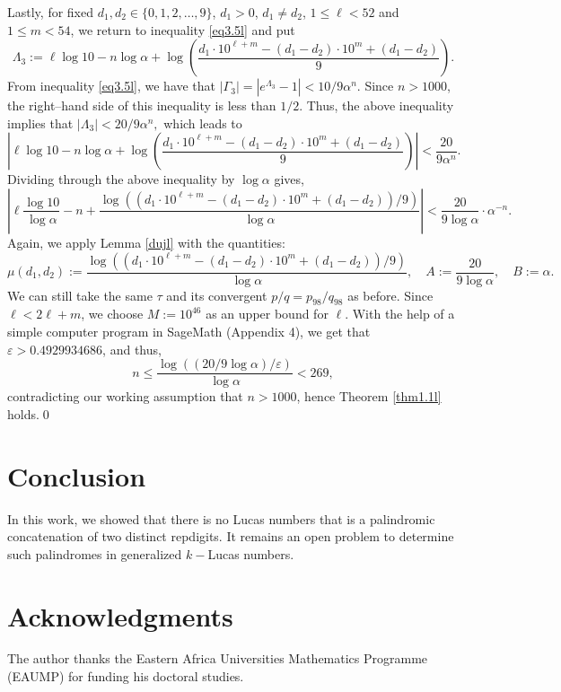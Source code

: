 Lastly, for fixed \( d_1, d_2 \in \{0, 1, 2, \ldots, 9\} \), \( d_1 > 0 \), \(d_1 \neq d_2\), \( 1 \leq \ell <52 \) and \( 1 \leq m < 54 \), we return to inequality \eqref{eq3.5l} and put
\[
\Lambda_3 := \ell \log 10 - n \log \alpha + \log \left( \frac{d_1 \cdot 10^{\ell+m} - (d_1 - d_2) \cdot 10^m + (d_1 - d_2)}{9} \right).
\]
From inequality \eqref{eq3.5l}, we have that $
|\Gamma_3| = |e^{\Lambda_3} - 1| < 10/9\alpha^n$. Since \( n > 1000 \), the right--hand side of this inequality is less than \( 1/2 \). Thus, the above inequality implies that
$
|\Lambda_3| < 20/9\alpha^n,
$
which leads to
\[
\left| \ell \log 10 - n \log \alpha + \log \left( \frac{d_1 \cdot 10^{\ell+m} - (d_1 - d_2) \cdot 10^m + (d_1 - d_2)}{9} \right) \right| < \frac{20}{9\alpha^n}.
\]
Dividing through the above inequality by \( \log \alpha \) gives,
\[
\left| \ell\frac{ \log 10}{\log \alpha} - n + \frac{\log \left( (d_1 \cdot 10^{\ell+m} - (d_1 - d_2) \cdot 10^m + (d_1 - d_2))/9 \right)}{\log \alpha} \right| < \frac{20}{ 9\log \alpha}\cdot \alpha^{-n}.
\]
Again, we apply Lemma \ref{dujl} with the quantities:
\[
\mu(d_1, d_2) := \frac{\log \left( (d_1 \cdot 10^{\ell+m} - (d_1 - d_2) \cdot 10^m + (d_1 - d_2))/9 \right)}{\log \alpha}, \quad A := \frac{20}{9\log \alpha}, \quad B := \alpha.
\]
We can still take the same \( \tau \) and its convergent \( p/q = p_{98}/q_{98} \) as before. Since \( \ell < 2\ell + m \), we choose \( M := 10^{46} \) as an upper bound for \( \ell \). With the help of a simple computer program in SageMath (Appendix 4), we get that \( \varepsilon > 0.4929934686 \), and thus,
\[
n \leq \frac{\log((20/9\log \alpha)/\varepsilon)}{\log \alpha} < 269,
\]
contradicting our working assumption that \( n > 1000 \), hence Theorem \ref{thm1.1l} holds.\qed

\section*{Conclusion}
In this work, we showed that there is no Lucas numbers that is a palindromic concatenation of two distinct repdigits. It remains an open problem to determine such palindromes in generalized $k-$Lucas numbers. 
\section*{Acknowledgments} 
The author thanks the Eastern Africa Universities Mathematics Programme (EAUMP) for funding his doctoral studies. 

